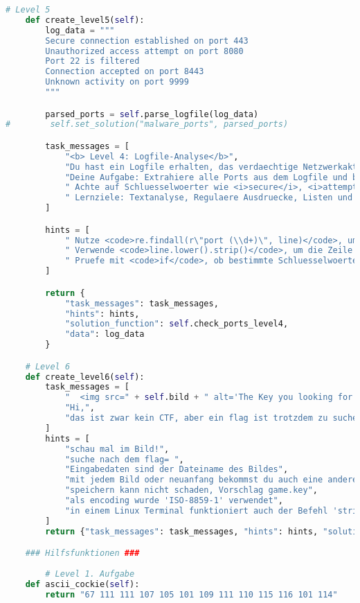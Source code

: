 \documentclass[a4paper 11pt]{article}
\begin{document}
\begin{lstlisting}[language=python, caption=der Raum]
    # Level 5
    def create_level5(self):
        log_data = """
        Secure connection established on port 443
        Unauthorized access attempt on port 8080
        Port 22 is filtered
        Connection accepted on port 8443
        Unknown activity on port 9999
        """

        parsed_ports = self.parse_logfile(log_data)
#        self.set_solution("malware_ports", parsed_ports)

        task_messages = [
            "<b> Level 4: Logfile-Analyse</b>",
            "Du hast ein Logfile erhalten, das verdaechtige Netzwerkaktivitaeten enthaelt.",
            "Deine Aufgabe: Extrahiere alle Ports aus dem Logfile und bestimme ihren Status.",
            " Achte auf Schluesselwoerter wie <i>secure</i>, <i>attempt</i>, <i>filtered</i>.",
            " Lernziele: Textanalyse, Regulaere Ausdruecke, Listen und Dictionaries"
        ]

        hints = [
            " Nutze <code>re.findall(r\"port (\\d+)\", line)</code>, um Portnummern zu extrahieren.",
            " Verwende <code>line.lower().strip()</code>, um die Zeile zu normalisieren.",
            " Pruefe mit <code>if</code>, ob bestimmte Schluesselwoerter enthalten sind."
        ]

        return {
            "task_messages": task_messages,
            "hints": hints,
            "solution_function": self.check_ports_level4,
            "data": log_data
        }

    # Level 6
    def create_level6(self):
        task_messages = [
            "  <img src=" + self.bild + " alt='The Key you looking for' height='200'/> ",
            "Hi,",
			"das ist zwar kein CTF, aber ein flag ist trotzdem zu suchen"
        ]
        hints = [
            "schau mal im Bild!",
            "suche nach dem flag= ",
            "Eingabedaten sind der Dateiname des Bildes",
            "mit jedem Bild oder neuanfang bekommst du auch eine andere flag",
            "speichern kann nicht schaden, Vorschlag game.key",
            "als encoding wurde 'ISO-8859-1' verwendet",
            "in einem Linux Terminal funktioniert auch der Befehl 'strings [Dateiname]' "
        ]
        return {"task_messages": task_messages, "hints": hints, "solution_function": STEGO.im_bild_finden, "data": self.bild}

    ### Hilfsfunktionen ###
    
        # Level 1. Aufgabe
    def ascii_cockie(self):
        return "67 111 111 107 105 101 109 111 110 115 116 101 114"


\end{lstlisting}
\end{document}
